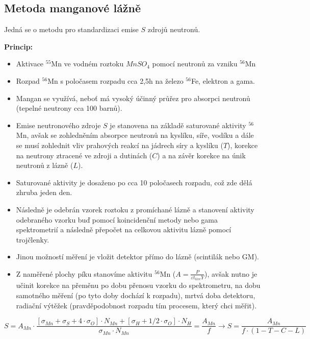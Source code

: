 \subsection{Metoda manganové lážně}

Jedná se o metodu pro standardizaci emise $S$ zdrojů neutronů.

\textbf{Princip:}

\begin{itemize}
    \item Aktivace $^{55}$Mn ve vodném roztoku $MnSO_4$ pomocí neutronů za vzniku $^{56}$Mn
    \item Rozpad $^{56}$Mn s poločasem rozpadu cca 2,5h na železo $^{56}$Fe, elektron a gama.
    \item Mangan se využívá, neboť má vysoký účinný průřez pro absorpci neutronů (tepelné neutrony cca 100 barnů).
    \item Emise neutronového zdroje $S$ je stanovena na základě saturované aktivity $^{56}$Mn, avšak se zohledněním absorpce neutronů na kyslíku, síře, vodíku a dále se musí zohlednit vliv prahových reakcí na jádrech síry a kyslíku ($T$), korekce na neutrony ztracené ve zdroji a dutinách ($C$) a na závěr korekce na únik neutronů z lázně ($L$).
    \item Saturované aktivity je dosaženo po cca 10 poločasech rozpadu, což zde dělá zhruba jeden den.
    \item Následně je odebrán vzorek roztoku z promíchané lázně a stanovení aktivity odebraného vzorku buď pomocí koincidenční metody nebo gama spektrometrií a následně přepočet na celkovou aktivitu lázně pomocí trojčlenky.
    \item Jinou možností měření je vložit detektor přímo do lázně (scintilák nebo GM).
    \item Z naměřené plochy píku stanovíme aktivitu $^{56}$Mn ($A=\frac{P}{\varepsilon t_{live} Y}$), avšak nutno je učinit korekce na přeměnu po dobu přenosu vzorku do spektrometru, na dobu samotného měření (po tyto doby dochází k rozpadu), mrtvá doba detektoru, radiační výtěžek (pravděpodobnost rozpadu tím procesem, který chci měřit).
\end{itemize}

\begin{equation}
    S = A_{Mn} \cdot \frac{[\sigma_{Mn} + \sigma_S + 4\cdot\sigma_O]\cdot N_{Mn} + [\sigma_H + 1/2 \cdot \sigma_O]\cdot N_H}{\sigma_{Mn}\cdot N_{Mn}} = \frac{A_{Mn}}{f}  \rightarrow  S = \frac{A_{Mn}}{f\cdot(1- T - C - L)}
\end{equation}

